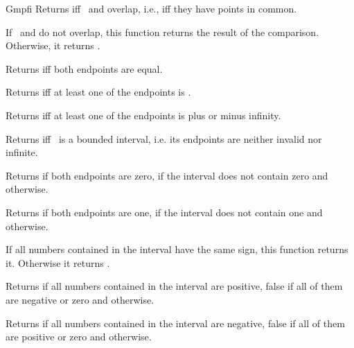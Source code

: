 \begin{ccRefClass} {Gmpfi}
        {Returns  iff \ccVar~and  overlap,
        i.e., iff they have points in common.}

        {If \ccVar~and  do not overlap, this function returns
        the result of the comparison. Otherwise, it returns
        .}


\ccQueryFunctions
{}
        {Returns  iff both endpoints are equal.}

        {Returns  iff at least one of the endpoints is
        .}

        {Returns  iff at least one of the endpoints is plus or
        minus infinity.}

        {Returns  iff \ccVar~is a bounded interval, i.e. its
        endpoints are neither invalid nor infinite.}

        {Returns  if both endpoints are zero,  if
        the interval does not contain zero and 
        otherwise.}

        {Returns  if both endpoints are one, 
        if the interval does not contain one and 
        otherwise.}

        {If all numbers contained in the interval have the same sign, this
        function returns it. Otherwise it returns .}

        {Returns  if all numbers contained in the interval
        are positive, false if all of them are negative or zero and
         otherwise.}

        {Returns  if all numbers contained in the interval
        are negative, false if all of them are positive or zero and
         otherwise.}



\end{ccRefClass}
